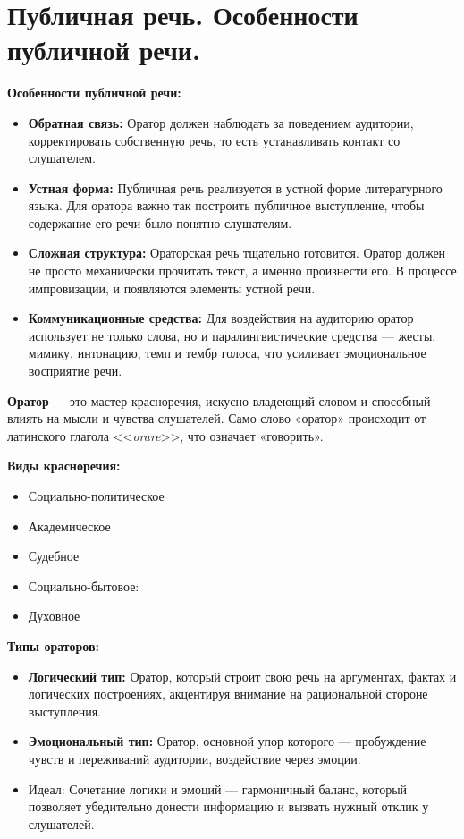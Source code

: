 \section{Публичная речь. Особенности публичной речи.}

\textbf{Особенности публичной речи:}
\begin{itemize}
	\item \textbf{Обратная связь:} Оратор должен наблюдать за
	поведением аудитории, корректировать собственную речь, то есть устанавли­вать контакт со слушателем.
	
	\item \textbf{Устная форма:} Публичная речь реализуется в
	устной форме литературного языка. Для оратора важно так построить публичное выступление, чтобы содержание его речи было понятно слушателям.
	
	\item \textbf{Сложная структура:} Ораторская речь тщательно готовится. Оратор должен не просто механически прочитать текст, а именно произнести его. В процессе импровизации, и появляются элементы устной речи. 
	
	\item \textbf{Коммуникационные средства:} Для воздействия на аудиторию оратор использует не только слова, но и паралингвистические средства — жесты, мимику, интонацию, темп и тембр голоса, что усиливает эмоциональное восприятие речи.
\end{itemize}

\textbf{Оратор} — это мастер красноречия, искусно владеющий словом и способный влиять на мысли и чувства слушателей. Само слово «оратор» происходит от латинского глагола <<\textit{orare}>>, что означает «говорить».

\textbf{Виды красноречия:}
\begin{itemize}
	\item Социально-политическое
	\item Академическое
	\item Судебное
	\item Социально-бытовое:
	\item Духовное
\end{itemize}

\textbf{Типы ораторов:}
\begin{itemize}
	\item \textbf{Логический тип:} Оратор, который строит свою речь на аргументах, фактах и логических построениях, акцентируя внимание на рациональной стороне выступления.
	
	\item \textbf{Эмоциональный тип:} Оратор, основной упор которого — пробуждение чувств и переживаний аудитории, воздействие через эмоции.
	
	\item Идеал: Сочетание логики и эмоций — гармоничный баланс, который позволяет убедительно донести информацию и вызвать нужный отклик у слушателей.
\end{itemize}

